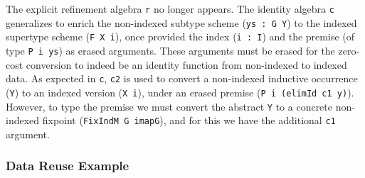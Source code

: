 \documentclass[acmsmall,screen]{acmart}
\begin{document}
The explicit refinement algebra \verb;r; no longer appears. The
identity algebra \verb;c; generalizes to enrich the non-indexed
subtype scheme (\verb;ys : G Y;) to the indexed supertype scheme
(\verb;F X i;), once provided the index (\verb;i : I;) and the premise
(of type \verb;P i ys;) as erased arguments. These arguments must be
erased for the zero-cost conversion to indeed be an identity function
from non-indexed to indexed data. As expected in \verb;c;,
\verb;c2; is used to convert a non-indexed inductive occurrence
(\verb;Y;) to an indexed version (\verb;X i;), under an erased premise
(\verb;P i (elimId c1 y);). However, to type the premise we must
convert the abstract \verb;Y; to a concrete non-indexed
fixpoint (\verb;FixIndM G imapG;), and for this we have the
additional \verb;c1; argument.

\subsubsection{Data Reuse Example}
\end{document}
